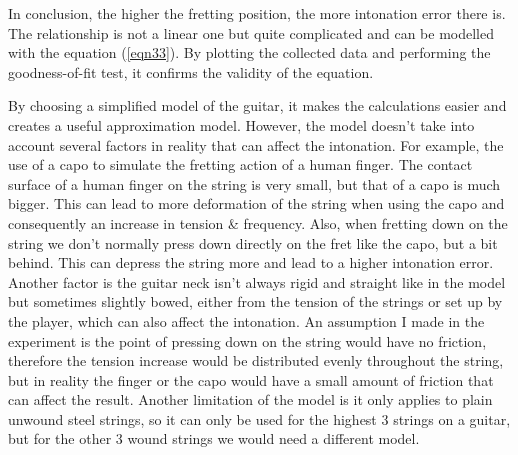 In conclusion, the higher the fretting position, the more intonation error there is. The relationship is not a linear one but quite complicated and can be modelled with the equation (\ref{eqn33}). By plotting the collected data and performing the goodness-of-fit test, it confirms the validity of the equation. \par
By choosing a simplified model of the guitar, it makes the calculations easier and creates a useful approximation model. However, the model doesn't take into account several factors in reality that can affect the intonation. For example, the use of a capo to simulate the fretting action of a human finger. The contact surface of a human finger on the string is very small, but that of a capo is much bigger. This can lead to more deformation of the string when using the capo and consequently an increase in tension \& frequency. Also, when fretting down on the string we don't normally press down directly on the fret like the capo, but a bit behind. This can depress the string more and lead to a higher intonation error. Another factor is the guitar neck isn't always rigid and straight like in the model but sometimes slightly bowed, either from the tension of the strings or set up by the player, which can also affect the intonation. An assumption I made in the experiment is the point of pressing down on the string would have no friction, therefore the tension increase would be distributed evenly throughout the string, but in reality the finger or the capo would have a small amount of friction that can affect the result. Another limitation of the model is it only applies to plain unwound steel strings, so it can only be used for the highest 3 strings on a guitar, but for the other 3 wound strings we would need a different model.\par

